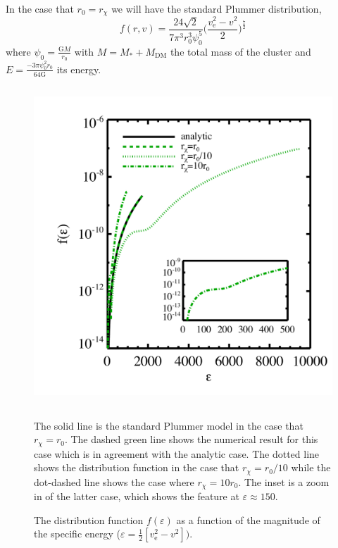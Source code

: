 \documentclass[aps,floatfix,prd,showpacs]{revtex4}
\newcommand{\vesc}{v_{\text{e}}}
\newcommand{\G}{\text{G}}
\newcommand{\rx}{r_\chi}
\begin{document}
In the case that $r_0 = \rx$ we will have the standard Plummer distribution,
%
\begin{equation} 
f(r,v) = \frac{24\sqrt{2}}{7\pi^3r_0^3\psi_0^5}\bigg(\frac{\vesc^2 - {v}^2}{2}\bigg)^\frac{7}{2}
\end{equation}
%
%
where $\psi_0 = \frac{\G M}{r_0}$ with $M = M_* + M_{\mathrm{DM}}$ the total mass of the cluster and $E = \frac{-3\pi\psi_0^2r_0}{64\G}$ its energy. 
%
\begin{figure}[htp]
\centering
\includegraphics[width=12cm, height=12cm]{Plummer_Compare}
\caption{The distribution function $f(\varepsilon)$ as a function of the magnitude of the specific energy \big($\varepsilon = \frac{1}{2}[\vesc^2-v^2]\big).$} The solid line is the standard Plummer model in the case that $\rx = r_0$. The dashed green line shows the numerical result for this case which is in agreement with the analytic case. The dotted line shows the distribution function in the case that $\rx = r_0/10$ while the dot-dashed line shows the case where $\rx = 10r_0$. The inset is a zoom in of the latter case, which shows the feature at $\varepsilon \approx 150$.
\label{dist func}
\end{figure}
%
\end{document}
